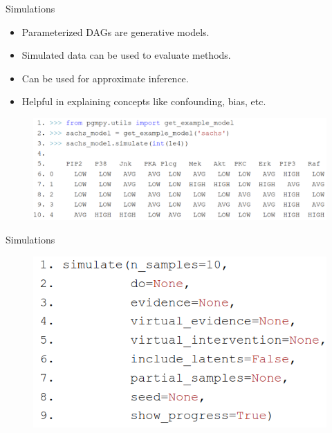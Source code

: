 \documentclass[aspectratio=169]{beamer}
\begin{document}
\begin{frame}{Simulations}
	\begin{itemize}
		\item Parameterized DAGs are generative models.
		\item Simulated data can be used to evaluate methods.
		\item Can be used for approximate inference.
		\item Helpful in explaining concepts like confounding, bias, etc.
	\end{itemize}
	\begin{figure}
		\centering
		\includegraphics[scale=0.3]{imgs/data_sim.png}
	\end{figure}
\end{frame}
\begin{frame}{Simulations}
	\begin{figure}
		\centering
		\includegraphics[scale=0.3]{imgs/simulate_fun.png}
	\end{figure}
\end{frame}
\end{document}
